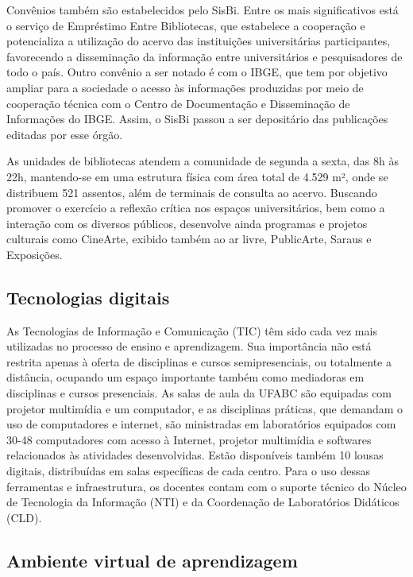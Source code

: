 Convênios também são estabelecidos pelo SisBi.
Entre os mais significativos está o serviço de Empréstimo Entre Bibliotecas,
que estabelece a cooperação e potencializa a utilização do acervo das
instituições universitárias participantes, favorecendo a disseminação da
informação entre universitários e pesquisadores de todo o país. 
Outro convênio a ser notado é com o IBGE, que tem por objetivo ampliar para a
sociedade o acesso às informações produzidas por meio de cooperação técnica
com o Centro de Documentação e Disseminação de Informações do IBGE.
Assim, o SisBi passou a ser depositário das publicações editadas por esse órgão.

As unidades de bibliotecas atendem a comunidade de segunda a sexta, das 8h às
22h, mantendo-se em uma estrutura física com área total de 4.529 m², onde se
distribuem 521 assentos, além de terminais de consulta ao acervo.
Buscando promover o exercício a reflexão crítica nos espaços universitários,
bem como a interação com os diversos públicos, desenvolve ainda programas e
projetos culturais como CineArte, exibido também ao ar livre, PublicArte,
Saraus e Exposições.

\subsection{Tecnologias digitais}

As Tecnologias de Informação e Comunicação (TIC) têm sido cada vez mais
utilizadas no processo de ensino e aprendizagem.
Sua importância não está restrita apenas à oferta de disciplinas e cursos
semipresenciais, ou totalmente a distância, ocupando um espaço importante
também como mediadoras em disciplinas e cursos presenciais.
As salas de aula da UFABC são equipadas com projetor multimídia e um
computador, e as disciplinas práticas, que demandam o uso de computadores e
internet, são ministradas em laboratórios equipados com 30-48 computadores com
acesso à Internet, projetor multimídia e softwares relacionados às atividades
desenvolvidas. 
Estão disponíveis também 10 lousas digitais, distribuídas em salas específicas
de cada centro. 
Para o uso dessas ferramentas e infraestrutura, os docentes contam com o
suporte técnico do Núcleo de Tecnologia da Informação (NTI) e da Coordenação de
Laboratórios Didáticos (CLD).

\subsection{Ambiente virtual de aprendizagem}

